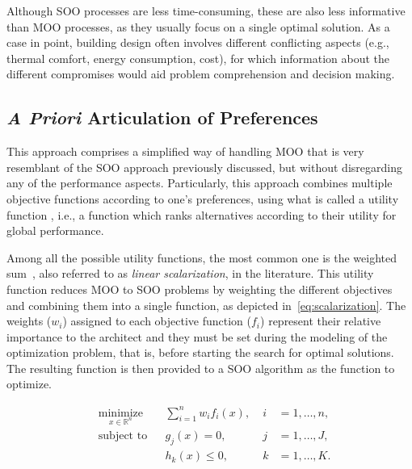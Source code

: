 	Although \ac{SOO} processes are less time-consuming, these are also less informative than \ac{MOO} processes, as they usually focus on a single optimal solution. As a case in point, building design often involves different conflicting aspects (e.g., thermal comfort, energy consumption, cost), for which information about the different compromises would aid problem comprehension and decision making.
	
	\subsection{\textit{A Priori} Articulation of Preferences}
	\label{ssec:preferencesarticulation}
	
	This approach comprises a simplified way of handling \ac{MOO} that is very resemblant of the \ac{SOO} approach previously discussed, but without disregarding any of the performance aspects. Particularly, this approach combines multiple objective functions according to one’s preferences, using what is called a utility function \cite{Marler2004}, i.e., a function which ranks alternatives according to their utility for global performance. 
	
	Among all the possible utility functions, the most common one is the weighted sum~\cite{Wortmann2017Opossum}, also referred to as \textit{linear scalarization}, in the literature. This utility function reduces \ac{MOO} to \ac{SOO} problems by weighting the different objectives and combining them into a single function, as depicted in~\cref{eq:scalarization}. The weights ($w_i$) assigned to each objective function ($f_i$) represent their relative importance to the architect and they must be set during the modeling of the optimization problem, that is, before starting the search for optimal solutions. The resulting function is then provided to a \ac{SOO} algorithm as the function to optimize. 
	
	\begin{equation} \label{eq:scalarization}
	\begin{aligned}
	& \underset{x \in \mathbb{R}^n}{\text{minimize}}
	& & \sum_{i=1}^n w_i f_i(x), & \; i &= 1, \ldots, n, \\
	& \text{subject to}
	& & g_j(x) = 0, & \; j &= 1, \ldots, J, \\ 
	&&& h_k(x) \leq 0, & \; k &= 1, \ldots, K.
	\end{aligned}
	\end{equation}
	
